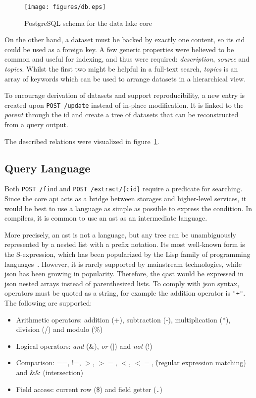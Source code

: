 \begin{figure}
  \texttt{[image: figures/db.eps]}
  \caption{PostgreSQL schema for the data lake core}
  \label{db}
\end{figure}

On the other hand, a dataset must be backed by exactly one content,
so its \gls{cid} could be used as a foreign key.  A few generic properties
were believed to be common and useful for indexing, and thus were required:
\emph{description}, \emph{source} and \emph{topics}.  Whilst the first two
might be helpful in a full-text search, \emph{topics} is an array of
keywords which can be used to arrange datasets in a hierarchical view.

To encourage derivation of datasets and support reproducibility, a new entry
is created upon \verb|POST /update| instead of in-place modification.  It is
linked to the \emph{parent} through the \gls{id} and create a \gls{tree}
of datasets that can be reconstructed from a query output.

The described relations were visualized in figure~\ref{db}.

\subsection{Query Language}
Both \verb|POST /find| and \verb|POST /extract/{cid}| require a \gls{predicate}
for searching.  Since the core \gls{api} acts as a bridge between storages
and higher-level services, it would be best to use a language as simple
as possible to express the condition.  In compilers, it is common to use
an \gls{ast} as an intermediate language.

More precisely, an \gls{ast} is not a language, but any tree can
be unambiguously represented by a nested list with a prefix notation.
Its most well-known form is the S-expression, which has been popularized
by the Lisp family of programming languages~\cite{sexpr}.  However, it is
rarely supported by mainstream technologies, while \gls{json} has been
growing in popularity.  Therefore, the \gls{qast} would be expressed
in \gls{json} nested arrays instead of parenthesized lists.  To comply
with \gls{json} syntax, operators must be quoted as a string, for example
the addition operator is \verb|"+"|.  The following are supported:
\begin{itemize}
  \item Arithmetic operators: addition (+), subtraction (-), multiplication (*),
    division (/) and modulo (\%)
  \item Logical operators: \emph{and} (\&), \emph{or} ($\vert$)
    and \emph{not} (!)
  \item Comparison: ==, !=, $>$, $>=$, $<$, $<=$,
    \~ (regular expression matching) and \&\& (intersection)
  \item Field access: current row (\$) and field getter (\verb|.|)
\end{itemize}

